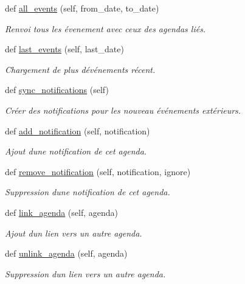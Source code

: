 \begin{DoxyCompactItemize}
\mbox{\label{classSource_1_1core_1_1agenda_1_1Agenda_ad00ef12f8cab0332d96234f094b66e6b}} 
def \mbox{\hyperlink{classSource_1_1core_1_1agenda_1_1Agenda_ad00ef12f8cab0332d96234f094b66e6b}{all\+\_\+events}} (self, from\+\_\+date, to\+\_\+date)
\begin{DoxyCompactList}\small\item\em Renvoi tous les évenement avec ceux des agendas liés. \end{DoxyCompactList}\item 
\mbox{\label{classSource_1_1core_1_1agenda_1_1Agenda_a92e46c6575dcbb5c6ae030e4420d7030}} 
def \mbox{\hyperlink{classSource_1_1core_1_1agenda_1_1Agenda_a92e46c6575dcbb5c6ae030e4420d7030}{last\+\_\+events}} (self, last\+\_\+date)
\begin{DoxyCompactList}\small\item\em Chargement de plus d\textquotesingle{}événements récent. \end{DoxyCompactList}\item 
def \mbox{\hyperlink{classSource_1_1core_1_1agenda_1_1Agenda_a49963bf70decca8bf319f4487ff90e47}{sync\+\_\+notifications}} (self)
\begin{DoxyCompactList}\small\item\em Créer des notifications pour les nouveau événements extérieurs. \end{DoxyCompactList}\item 
def \mbox{\hyperlink{classSource_1_1core_1_1agenda_1_1Agenda_a40d2789a7f02d15bfd205c1be9b82814}{add\+\_\+notification}} (self, notification)
\begin{DoxyCompactList}\small\item\em Ajout d\textquotesingle{}une notification de cet agenda. \end{DoxyCompactList}\item 
def \mbox{\hyperlink{classSource_1_1core_1_1agenda_1_1Agenda_a34ea6d5e23cfc5aeb271ba1d2b1eb9c4}{remove\+\_\+notification}} (self, notification, ignore)
\begin{DoxyCompactList}\small\item\em Suppression d\textquotesingle{}une notification de cet agenda. \end{DoxyCompactList}\item 
def \mbox{\hyperlink{classSource_1_1core_1_1agenda_1_1Agenda_a8507315e466edecb3c514524e0921050}{link\+\_\+agenda}} (self, agenda)
\begin{DoxyCompactList}\small\item\em Ajout d\textquotesingle{}un lien vers un autre agenda. \end{DoxyCompactList}\item 
def \mbox{\hyperlink{classSource_1_1core_1_1agenda_1_1Agenda_a5fc4d8bb32863edde30afa3474da14c2}{unlink\+\_\+agenda}} (self, agenda)
\begin{DoxyCompactList}\small\item\em Suppression d\textquotesingle{}un lien vers un autre agenda. \end{DoxyCompactList}\end{DoxyCompactItemize}
